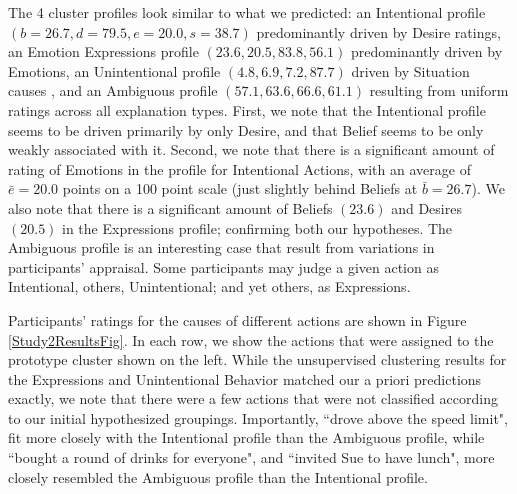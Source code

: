 \documentclass[10pt,letterpaper]{article}
\begin{document}





The 4 cluster profiles look similar to what we predicted: an Intentional profile $(b=26.7, d=79.5, e=20.0, s=38.7)$ predominantly driven by Desire ratings, an Emotion Expressions profile $(23.6, 20.5, 83.8, 56.1)$ predominantly driven by Emotions, an Unintentional profile $(4.8,6.9,7.2,87.7)$ driven by Situation causes , and an Ambiguous profile $(57.1, 63.6, 66.6, 61.1)$ resulting from uniform ratings across all explanation types. First, we note that the Intentional profile seems to be driven primarily by only Desire, and that Belief seems to be only weakly associated with it. Second, we note that there is a significant amount of rating of Emotions in the profile for Intentional Actions, with an average of $\bar{e}=20.0$ points on a 100 point scale (just slightly behind Beliefs at $\bar{b}=26.7$). We also note that there is a significant amount of Beliefs $(23.6)$ and Desires $(20.5)$ in the Expressions profile; confirming both our hypotheses. 
The Ambiguous profile is an interesting case that result from variations in participants' appraisal. Some participants may judge a given action as Intentional, others, Unintentional; and yet others, as Expressions. %

Participants' ratings for the causes of different actions are shown in Figure \ref{Study2ResultsFig}. In each row, we show the actions that were assigned to the prototype cluster shown on the left. While the unsupervised clustering results for the Expressions and Unintentional Behavior matched our a priori predictions exactly, we note that there were a few actions that were not classified according to our initial hypothesized groupings. Importantly, ``drove above the speed limit", fit more closely with the Intentional profile than the Ambiguous profile, while ``bought a round of drinks for everyone", and ``invited Sue to have lunch", more closely resembled the Ambiguous profile than the Intentional profile.
\end{document}
